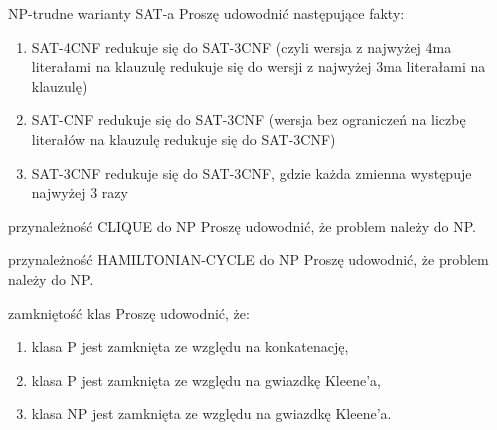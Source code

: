 \begin{exercise}{NP-trudne warianty SAT-a}
    Proszę udowodnić następujące fakty:

\begin{enumerate}
    \item SAT-4CNF redukuje się do SAT-3CNF (czyli wersja z najwyżej 4ma literałami na klauzulę redukuje się do wersji z najwyżej 3ma literałami na klauzulę)
    \item SAT-CNF redukuje się do SAT-3CNF (wersja bez ograniczeń na liczbę literałów na klauzulę redukuje się do SAT-3CNF)
    \item SAT-3CNF redukuje się do SAT-3CNF, gdzie każda zmienna występuje najwyżej 3 razy
\end{enumerate}
\end{exercise}

\begin{exercise}{przynależność CLIQUE do NP}
    Proszę udowodnić, że problem  należy do NP.
\end{exercise}

\begin{exercise}{przynależność HAMILTONIAN-CYCLE do NP}
    Proszę udowodnić, że problem  należy do NP.
\end{exercise}

\begin{exercise}{zamkniętość klas}
    Proszę udowodnić, że:

\begin{enumerate}
    \item klasa P jest zamknięta ze względu na konkatenację,
    \item klasa P jest zamknięta ze względu na gwiazdkę Kleene'a,
    \item klasa NP jest zamknięta ze względu na gwiazdkę Kleene'a.
\end{enumerate}
\end{exercise}